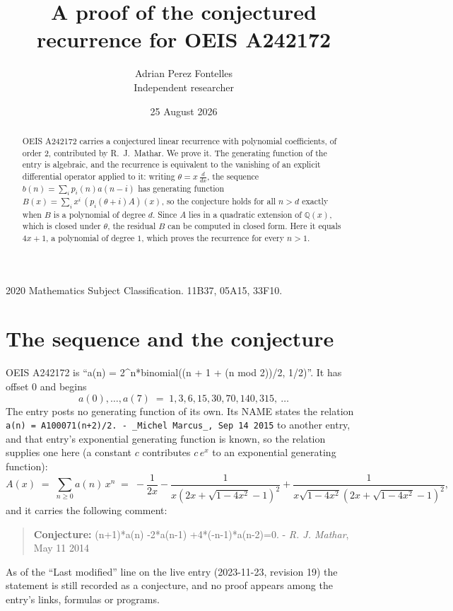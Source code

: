 \documentclass[11pt,a4paper]{article}
\title{A proof of the conjectured recurrence for OEIS A242172}
\author{Adrian Perez Fontelles\\ \small Independent researcher}
\date{25 August 2026}
\theoremstyle{plain}
\theoremstyle{definition}
\begin{document}
\maketitle

\begin{abstract}
OEIS A242172 carries a conjectured linear recurrence with polynomial coefficients, of
order 2, contributed by R.~J.~Mathar. We prove it. The generating function of the
entry is algebraic, and the recurrence is equivalent to the vanishing of an explicit
differential operator applied to it: writing $\theta=x\,\frac{d}{dx}$, the sequence
$b(n)=\sum_{i}p_{i}(n)a(n-i)$ has generating function
$B(x)=\sum_{i}x^{i}\,(p_{i}(\theta+i)A)(x)$, so the conjecture holds for all $n>d$ exactly
when $B$ is a polynomial of degree $d$. Since $A$ lies in a quadratic extension of
$\mathbb{Q}(x)$, which is closed under $\theta$, the residual $B$ can be computed in
closed form. Here it equals $4 x + 1$, a polynomial of degree $1$, which proves
the recurrence for every $n>1$.
\end{abstract}

\noindent\small 2020 Mathematics Subject Classification. 11B37, 05A15, 33F10.\normalsize

\section{The sequence and the conjecture}

OEIS A242172 is ``a(n) = 2\^{}n*binomial((n + 1 + (n mod 2))/2, 1/2)''. It has offset $0$ and begins
\[
a(0),\dots,a(7)\;=\;1, 3, 6, 15, 30, 70, 140, 315,\ \dots
\]
The entry posts no generating function of its own. Its NAME states the
relation \texttt{a(n) = A100071(n+2)/2. - \_Michel Marcus\_, Sep 14 2015} to another entry, and that entry's exponential generating
function is known, so the relation supplies one here (a constant $c$ contributes
$c\,e^{x}$ to an exponential generating function):
\begin{equation}\label{eq:gf}
A(x)\;=\;\sum_{n\ge 0} a(n)\,x^{n}\;=\;- \frac{1}{2 x} - \frac{1}{x \left(2 x + \sqrt{1 - 4 x^{2}} - 1\right)^{2}} + \frac{1}{x \sqrt{1 - 4 x^{2}} \left(2 x + \sqrt{1 - 4 x^{2}} - 1\right)^{2}} ,
\end{equation}
and it carries the following comment:
\begin{quote}\small
\textbf{Conjecture:} (n+1)*a(n) -2*a(n-1) +4*(-n-1)*a(n-2)=0. - \emph{R. J. Mathar}, May 11 2014
\end{quote}
As of the ``Last modified'' line on the live entry (2023-11-23, revision 19) the
statement is still recorded as a conjecture, and no proof appears among the entry's links,
formulas or programs.
\end{document}

